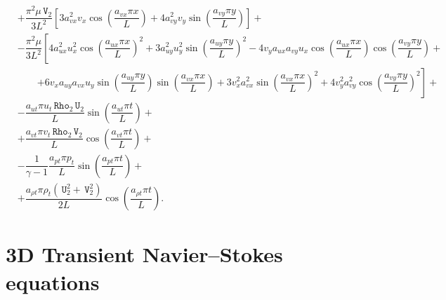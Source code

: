 \documentclass[10pt]{article}
\newcommand{\Rho}{\,\mathtt{Rho}}
\newcommand{\U}{\,\mathtt{U}}
\newcommand{\V}{\,\mathtt{V}}
\begin{document}
\begin{equation}
\begin{split}
&+\dfrac{\pi^2 \mu \V_2 }{3L^2} \left[3 a_{vx}^2 v_x \cos\left(\dfrac{a_{vx} \pi x}{L}\right) +4a_{vy}^2 v_y \sin\left(\dfrac{a_{vy} \pi y}{L}\right) \right] +\\
&- \dfrac{\pi^2 \mu }{3L^2}\left[4 a_{ux}^2 u_x^2 \cos\left(\dfrac{a_{ux} \pi x}{L}\right)^2+3 a_{uy}^2 u_y^2 \sin\left(\dfrac{a_{uy} \pi y}{L}\right)^2-4 v_y a_{ux} a_{vy} u_x \cos\left(\dfrac{a_{ux} \pi x}{L}\right) \cos\left(\dfrac{a_{vy} \pi y}{L}\right)\right.+\\
    &\qquad\left.+6 v_x a_{uy} a_{vx} u_y \sin\left(\dfrac{a_{uy} \pi y}{L}\right) \sin\left(\dfrac{a_{vx} \pi x}{L}\right)+3 v_x^2 a_{vx}^2 \sin\left(\dfrac{a_{vx} \pi x}{L}\right)^2+4 v_y^2 a_{vy}^2 \cos\left(\dfrac{a_{vy} \pi y}{L}\right)^2\right] +\\
&-\dfrac{a_{ut} \pi u_t  \Rho_2 \U_2 }{L}\sin\left(\dfrac{a_{ut} \pi t}{L}\right)+\\
&+\dfrac{a_{vt} \pi v_t  \Rho_2 \V_2 }{L}\cos\left(\dfrac{a_{vt} \pi t}{L}\right)+\\
&-\dfrac{1}{\gamma-1}\dfrac{a_{pt} \pi p_t }{L}\sin\left(\dfrac{a_{pt} \pi t}{L}\right)+\\
&+\dfrac{a_{\rho t} \pi \rho_t  (\U_2^2+\V_2^2)}{2L}\cos\left(\dfrac{a_{\rho t} \pi t}{L}\right)
.
 \end{split}
\end{equation}



\section{3D Transient Navier--Stokes equations}
\end{document}
